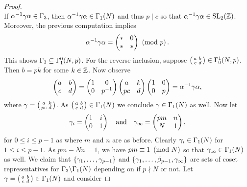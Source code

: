 \begin{proof}
\[        \]
        If $\alpha^{-1}\gamma\alpha \in \Gamma_{3}$, then $\alpha^{-1}\gamma\alpha \in \Gamma_{1}(N)$ and thus $p \mid c$ so that $\alpha^{-1}\gamma\alpha \in \mathrm{SL}_{2}(\mathbb{Z})$. Moreover, the previous computation implies
        \[
          \alpha^{-1}\gamma\alpha = \begin{pmatrix} \ast & 0 \\ \ast & \ast \end{pmatrix} \ \left(\text{mod }p\right).
        \]
        This shows $\Gamma_{3} \subseteq \Gamma_{1}^{0}(N,p)$. For the reverse inclusion, suppose $\begin{psmallmatrix} a & b \\ c & d \end{psmallmatrix} \in \Gamma_{0}^{1}(N,p)$. Then $b = pk$ for some $k \in \mathbb{Z}$. Now observe
        \[
          \begin{pmatrix} a & b \\ c & d \end{pmatrix} = \begin{pmatrix} 1 & 0 \\ 0 & p^{-1} \end{pmatrix}\begin{pmatrix} a & k \\ pc & d \end{pmatrix}\begin{pmatrix} 1 & 0 \\ 0 & p \end{pmatrix} = \alpha^{-1}\gamma\alpha,
        \]
        where $\gamma = \begin{psmallmatrix} a & k \\ pc & d \end{psmallmatrix}$. As $\begin{psmallmatrix} a & b \\ c & d \end{psmallmatrix} \in \Gamma_{1}(N)$ we conclude $\gamma \in \Gamma_{1}(N)$ as well. Now let
        \[
          \gamma_{i} = \begin{pmatrix} 1 & i \\ 0 & 1 \end{pmatrix} \quad \text{and} \quad \gamma_{\infty} = \begin{pmatrix} pm & n \\ N & 1 \end{pmatrix},
        \]
        for $0 \le i \le p-1$ as where $m$ and $n$ are as before. Clearly $\gamma_{i} \in \Gamma_{1}(N)$ for $1 \le i \le p-1$. As $pm-Nn = 1$, we have $pm \equiv 1 \ \left(\text{mod }N\right)$ so that $\gamma_{\infty} \in \Gamma_{1}(N)$ as well. We claim that $\{\gamma_{1},\ldots,\gamma_{p-1}\}$ and $\{\gamma_{1},\ldots,\beta_{p-1},\gamma_{\infty}\}$ are sets of coset representatives for $\Gamma_{3}\backslash\Gamma_{1}(N)$ depending on if $p \nmid N$ or not. Let $\gamma = \begin{psmallmatrix} a & b \\ c & d \end{psmallmatrix} \in \Gamma_{1}(N)$ and consider

\end{proof}

